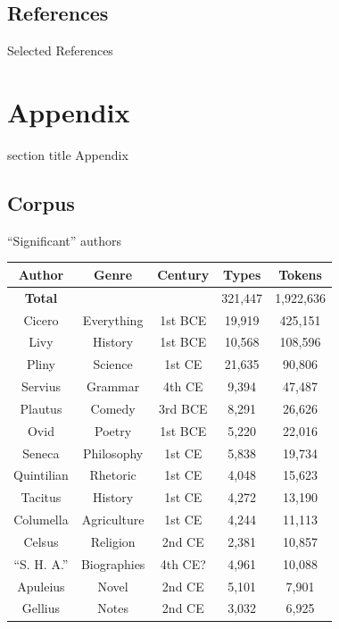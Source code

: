\documentclass{beamer}
\begin{document}
\subsection{References}

\begin{frame}{Selected References}
\nocite{*} %
\printbibliography[keyword={primary},heading=none]
\end{frame}

\appendix

\section*{Appendix}
\begin{frame}{}
    \begin{centering}
    \begin{beamercolorbox}[sep=12pt,center]{section title}
    Appendix
    \end{beamercolorbox}
    \end{centering}
\end{frame}

\subsection{Corpus}
\begin{frame}{``Significant'' authors}
\small
\begin{table}
\begin{tabular}{|c|c|c|c|c|}
\hline
\textbf{Author} & \textbf{Genre} & \textbf{Century} & \textbf{Types} & \textbf{Tokens} \\\hline
\textbf{Total} & & & 321,447 & 1,922,636 \\\hline\hline
Cicero & Everything & 1st BCE & 19,919 & 425,151 \\\hline
Livy & History & 1st BCE & 10,568 & 108,596 \\\hline
Pliny & Science & 1st CE & 21,635 & 90,806 \\\hline
Servius & Grammar & 4th CE & 9,394 & 47,487 \\\hline
Plautus & Comedy & 3rd BCE & 8,291 & 26,626 \\\hline
Ovid & Poetry & 1st BCE & 5,220 & 22,016 \\\hline
Seneca & Philosophy & 1st CE & 5,838 & 19,734 \\\hline
Quintilian & Rhetoric & 1st CE & 4,048 & 15,623 \\\hline
Tacitus & History & 1st CE & 4,272 & 13,190 \\\hline
Columella & Agriculture & 1st CE & 4,244 & 11,113 \\\hline
Celsus & Religion & 2nd CE & 2,381 & 10,857 \\\hline
``S. H. A.'' & Biographies & 4th CE? & 4,961 & 10,088 \\\hline
Apuleius & Novel & 2nd CE & 5,101 & 7,901 \\\hline
Gellius & Notes & 2nd CE & 3,032 & 6,925 \\\hline
\end{tabular}
\end{table}
\end{frame}
\end{document}
